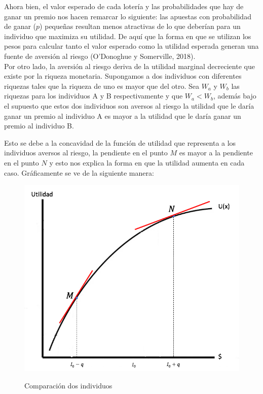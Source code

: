 Ahora bien, el valor esperado de cada lotería y las probabilidades que hay de ganar un premio nos hacen remarcar lo siguiente: las apuestas con probabilidad de ganar ($p$) pequeñas resultan menos atractivas de lo que deberían para un individuo que maximiza su utilidad. De aquí que la forma en que se utilizan los pesos para calcular tanto el valor esperado como la utilidad esperada generan una fuente de aversión al riesgo (O’Donoghue y Somerville, 2018). \\

Por otro lado, la aversión al riesgo deriva de la utilidad marginal decreciente que existe por la riqueza monetaria. Supongamos a dos individuos con diferentes riquezas tales que la riqueza de uno es mayor que del otro. Sea $W_a$ y $W_b$ las riquezas para los individuos A y B respectivamente y que $W_a < W_b$, además bajo el supuesto que estos dos individuos son aversos al riesgo la utilidad que le daría ganar un premio al individuo A es mayor a la utilidad que le daría ganar un premio al individuo B. \\

\newpage

Esto se debe a la concavidad de la función de utilidad que representa a los individuos aversos al riesgo, la pendiente en el punto $M$ es mayor a la pendiente en el punto $N$ y esto nos explica la forma en que la utilidad aumenta en cada caso. Gráficamente se ve de la siguiente manera:

\begin{figure}[H]
    \centering
    \caption{Comparación dos individuos}
    \label{fig:my_label}
    \includegraphics[width=.85\linewidth]{Imagenes/UE_MN.png} \\
\end{figure}




